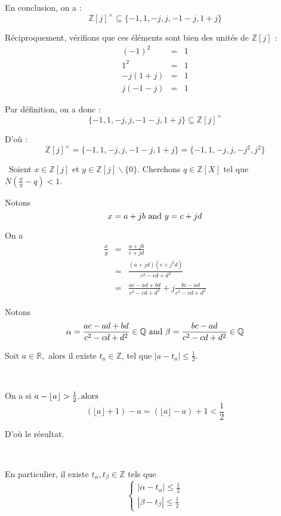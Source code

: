 En conclusion, on a :
\[ \mathbb{Z} [j]^{\times} \subseteq \{ - 1, 1, - j, j, - 1 - j, 1 + j \} \]


R{\'e}ciproquement, v{\'e}rifions que ces {\'e}l{\'e}ments sont bien des
unit{\'e}s de $\mathbb{Z} [j]$ :
\begin{eqnarray*}
  (- 1)^2 & = & 1\\
  1^2 & = & 1\\
  - j (1 + j) & = & 1\\
  j (- 1 - j) & = & 1
\end{eqnarray*}


Par d{\'e}finition, on a donc :
\[ \{ - 1, 1, - j, j, - 1 - j, 1 + j \} \subseteq \mathbb{Z} [j]^{\times} \]


D'o{\`u} :
\[ \mathbb{Z} [j]^{\times} = \{ - 1, 1, - j, j, - 1 - j, 1 + j \} = \{ - 1, 1,
   - j, j, - j^2, j^2 \} \]


 \ Soient $x \in \mathbb{Z} [j]$ et $y \in \mathbb{Z} [j]
\backslash \{ 0 \}$. Cherchons $q \in \mathbb{Z} [X]$ tel que $N \left(
\frac{x}{y} - q \right) < 1$.

Notons
\[ x = a + j b \text{ and } y = c + j d \]


On a
\begin{eqnarray*}
  \frac{x}{y} & = & \frac{a + j b}{c + j d}\\
  & = & \frac{(a + j d) (c + j^2 d)}{c^2 - c d + d^2}\\
  & = & \frac{a c - a d + b d}{c^2 - c d + d^2} + j \frac{b c - a d}{c^2 - c
  d + d^2}
\end{eqnarray*}


Notons
\[ \alpha = \frac{a c - a d + b d}{c^2 - c d + d^2} \in \mathbb{Q} \text{ and }
   \beta = \frac{b c - a d}{c^2 - c d + d^2} \in \mathbb{Q} \]


\tmtextbf{}

Soit $a \in \mathbb{R},$ alors il existe $t_a \in \mathbb{Z}$, tel que $| a -
t_a | \leqslant \frac{1}{2}$.

\


On a si $a - \lfloor a \rfloor > \frac{1}{2}, \operatorname{alors}$
\[ (\lfloor a \rfloor + 1) - a = (\lfloor a \rfloor - a) + 1 < \frac{1}{2} \]


D'o{\`u} le r{\'e}sultat.

\

En particulier, il existe $t_{\alpha}, t_{\beta} \in \mathbb{Z}$ tels que
\[ \left\{\begin{array}{l}
     | \alpha - t_{\alpha} | \leqslant \frac{1}{2}\\
     | \beta - t_{\beta} | \leqslant \frac{1}{2}
   \end{array}\right. \]



